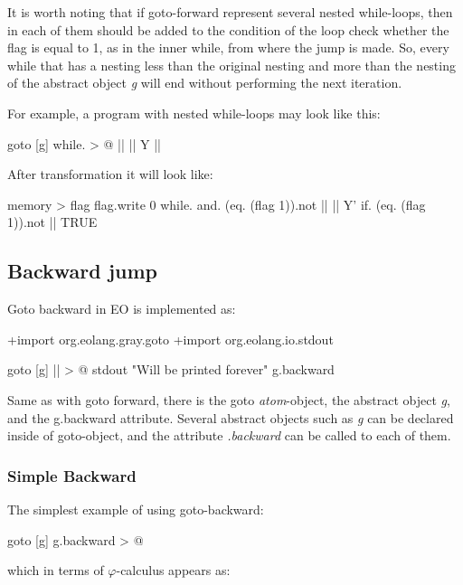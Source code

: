 \documentclass[sigplan,review,11pt,nonacm,natbib=false]{acmart}
\begin{document}
It is worth noting that if goto-forward represent several nested while-loops, then in each of them should be added to the condition of the loop check whether the flag is equal to 1, as in the inner while, from where the jump is made. So, every while that has a nesting less than the original nesting and more than the nesting of the abstract object \emph{g} will end without performing the next iteration.

For example, a program with nested while-loops may look like this:
\begin{ffcode}
goto
  [g]
    while. > @
      ||
      ||
        Y
        ||
\end{ffcode}

After transformation it will look like:
\begin{ffcode}
memory > flag
flag.write 0
while.
  and.
    (eq. (flag 1)).not
    ||
  ||
    Y'
    if.
      (eq. (flag 1)).not
      ||
      TRUE
\end{ffcode}






\subsection{Backward jump}
Goto backward in EO is implemented as:

\begin{ffcode}
+import org.eolang.gray.goto
+import org.eolang.io.stdout

goto
  [g]
    || > @
      stdout "Will be printed forever"
      g.backward
\end{ffcode}

Same as with goto forward, there is the goto \emph{atom}-object, the abstract object \emph{g}, and the g.backward attribute. Several abstract objects such as \emph{g} can be declared inside of goto-object, and the attribute \emph{.backward} can be called to each of them.

\subsubsection{Simple Backward} The simplest example of using goto-backward:

\begin{ffcode}
goto
  [g]
    g.backward > @
\end{ffcode}

which in terms of $\varphi$-calculus appears as:
\end{document}
